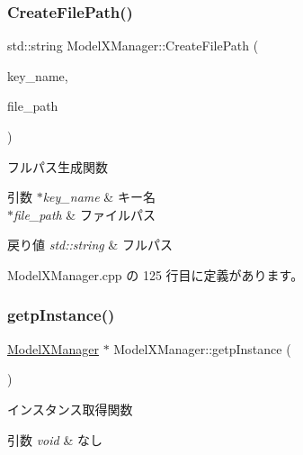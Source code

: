\subsubsection{\texorpdfstring{Create\+File\+Path()}{CreateFilePath()}}
{\footnotesize\ttfamily std\+::string Model\+X\+Manager\+::\+Create\+File\+Path (\begin{DoxyParamCaption}\item[{const std\+::string $\ast$}]{key\+\_\+name,  }\item[{const std\+::string $\ast$}]{file\+\_\+path }\end{DoxyParamCaption})\hspace{0.3cm}{\ttfamily [private]}}



フルパス生成関数 


\begin{DoxyParams}{引数}
{\em $\ast$key\+\_\+name} & キー名 \\
\hline
{\em $\ast$file\+\_\+path} & ファイルパス \\
\hline
\end{DoxyParams}

\begin{DoxyRetVals}{戻り値}
{\em std\+::string} & フルパス \\
\hline
\end{DoxyRetVals}


 Model\+X\+Manager.\+cpp の 125 行目に定義があります。

\mbox{\label{class_model_x_manager_a141baa9d96bf528ffced9a884b3b5828}} 
\subsubsection{\texorpdfstring{getp\+Instance()}{getpInstance()}}
{\footnotesize\ttfamily \mbox{\hyperlink{class_model_x_manager}{Model\+X\+Manager}} $\ast$ Model\+X\+Manager\+::getp\+Instance (\begin{DoxyParamCaption}{ }\end{DoxyParamCaption})\hspace{0.3cm}{\ttfamily [static]}}



インスタンス取得関数 


\begin{DoxyParams}{引数}
{\em void} & なし \\
\hline
\end{DoxyParams}

